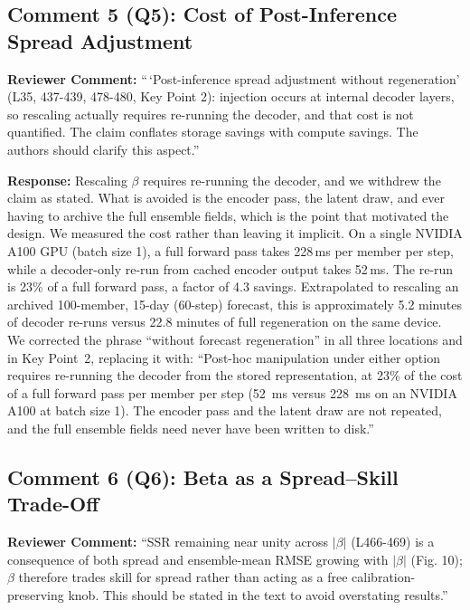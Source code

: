 \documentclass[12pt]{article}
\begin{document}
\subsection*{Comment 5 (Q5): Cost of Post-Inference Spread Adjustment}

\textbf{Reviewer Comment:} ``\,`Post-inference spread adjustment without regeneration'
(L35, 437-439, 478-480, Key Point 2): injection occurs at internal decoder layers, so
rescaling actually requires re-running the decoder, and that cost is not quantified.
The claim conflates storage savings with compute savings. The authors should clarify
this aspect.''

\textbf{Response:} Rescaling $\beta$ requires re-running the decoder, and we withdrew
the claim as stated. What is avoided is the encoder
pass, the latent draw, and ever having to archive the full ensemble fields, which is
the point that motivated the design. We measured the cost rather than leaving it
implicit. On a single NVIDIA A100 GPU (batch size 1), a full forward pass takes
228\,ms per member per step, while a decoder-only re-run from cached encoder output
takes 52\,ms. The re-run is 23\% of a full forward pass, a factor of 4.3 savings.
Extrapolated to rescaling an archived 100-member, 15-day (60-step) forecast, this is
approximately 5.2 minutes of decoder re-runs versus 22.8 minutes of full regeneration
on the same device. We corrected the phrase ``without forecast regeneration'' in
all three locations and in Key Point~2, replacing it with: ``Post-hoc manipulation under either option
requires re-running the decoder from the stored representation, at 23\% of the cost
of a full forward pass per member per step (52~ms versus 228~ms on an NVIDIA A100 at
batch size 1). The encoder pass and the latent draw are not repeated, and the full
ensemble fields need never have been written to disk.''

\subsection*{Comment 6 (Q6): Beta as a Spread--Skill Trade-Off}

\textbf{Reviewer Comment:} ``SSR remaining near unity across $|\beta|$ (L466-469) is
a consequence of both spread and ensemble-mean RMSE growing with $|\beta|$ (Fig. 10);
$\beta$ therefore trades skill for spread rather than acting as a free
calibration-preserving knob. This should be stated in the text to avoid overstating
results.''
\end{document}
